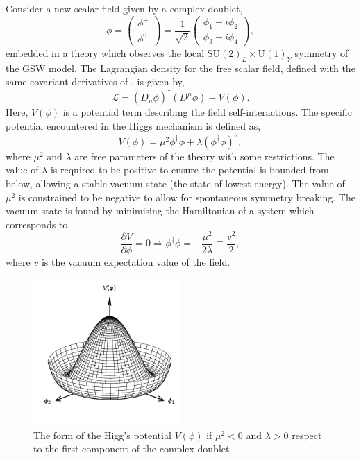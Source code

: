 Consider a new scalar field given by a complex doublet,
\begin{equation}
	\phi = \begin{pmatrix} \phi^+ \\ \phi^0 \end{pmatrix} = \frac{1}{\sqrt{2}} \begin{pmatrix} \phi_1 + i \phi_2 \\ \phi_3 + i \phi_4 \end{pmatrix},
\end{equation}
embedded in a theory which observes the local $\text{SU}(2)_L \times \text{U}(1)_Y$ symmetry of the GSW model.
The Lagrangian density for the free scalar field, defined with the same covariant derivatives of , is given by,
\begin{equation}
	\label{eq:higgs_lagrangian}
	\mathcal{L} = (D_\mu \phi)^\dagger (D^\mu \phi) - V(\phi).
\end{equation}
Here, $V(\phi)$ is a potential term describing the field self-interactions.
The specific potential encountered in the Higgs mechanism is defined as,
\begin{equation}
	\label{eq:higgs_potential}
	V(\phi) = \mu^2 \phi^\dagger \phi + \lambda (\phi^\dagger \phi)^2,
\end{equation}
where $\mu^2$ and $\lambda$ are free parameters of the theory with some restrictions.
The value of $\lambda$ is required to be positive to ensure the potential is bounded from below, allowing a stable vacuum state (the state of lowest energy).
The value of $\mu^2$ is constrained to be negative to allow for spontaneous symmetry breaking.
The vacuum state is found by minimising the Hamiltonian of a system which corresponds to,
\begin{equation}
	\frac{\partial V}{\partial \phi} = 0 \Longrightarrow  \phi^\dagger \phi = -\frac{\mu^2}{2\lambda} \equiv \frac{v^2}{2},
\end{equation}
where $v$ is the vacuum expectation value of the field.

\begin{figure}[h]
	\centering
	\includegraphics[width=0.5\textwidth]{Figures/standard_model/mexican_hat_potential}
	\caption{The form of the Higg's potential $V(\phi)$ if $\mu^2 < 0$ and $\lambda > 0$ respect to the first component of the complex doublet}
	\label{fig:mexican_hat}
\end{figure}

